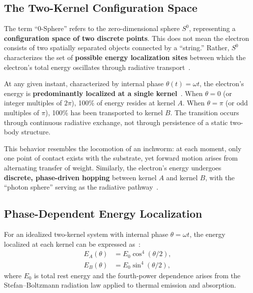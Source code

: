\documentclass[12pt,letterpaper]{article}
\begin{document}
\subsection{The Two-Kernel Configuration Space}

The term ``0-Sphere'' refers to the zero-dimensional sphere $S^0$, representing a \textbf{configuration space of two discrete points}. This does not mean the electron consists of two spatially separated objects connected by a ``string.'' Rather, $S^0$ characterizes the set of \textbf{possible energy localization sites} between which the electron's total energy oscillates through radiative transport~\cite{hanamura16759284}.

At any given instant, characterized by internal phase $\theta(t) = \omega t$, the electron's energy is \textbf{predominantly localized at a single kernel}~\cite{hanamura17765017}. When $\theta = 0$ (or integer multiples of $2\pi$), 100\% of energy resides at kernel $A$. When $\theta = \pi$ (or odd multiples of $\pi$), 100\% has been transported to kernel $B$. The transition occurs through continuous radiative exchange, not through persistence of a static two-body structure.

This behavior resembles the locomotion of an inchworm: at each moment, only one point of contact exists with the substrate, yet forward motion arises from alternating transfer of weight. Similarly, the electron's energy undergoes \textbf{discrete, phase-driven hopping} between kernel $A$ and kernel $B$, with the ``photon sphere'' serving as the radiative pathway~\cite{hanamura18511664}.

\subsection{Phase-Dependent Energy Localization}

For an idealized two-kernel system with internal phase $\theta = \omega t$, the energy localized at each kernel can be expressed as~\cite{hanamura16759284,hanamura18356895}:
\begin{align}
E_A(\theta) &= E_0 \cos^4(\theta/2), \\
E_B(\theta) &= E_0 \sin^4(\theta/2),
\end{align}
where $E_0$ is total rest energy and the fourth-power dependence arises from the Stefan--Boltzmann radiation law applied to thermal emission and absorption.
\end{document}

